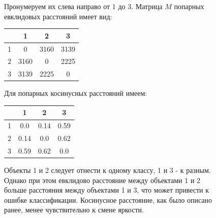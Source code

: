 \documentclass{article}
\begin{document}
\begin{figure}[H]
    Пронумеруем их слева направо от 1 до 3. Матрица $M$ попарных евклидовых расстояний имеет вид:
        \begin{center}
            \begin{tabular}{ c | c  c  c  }
                & 1 & 2 & 3 \\
                \hline
                1 & 0 & 3160 & 3139 \\
                2 & 3160 & 0 & 2225 \\
                3 & 3139 & 2225 & 0 \\
            \end{tabular}
            \end{center}
            Для попарных косинусных расстояний имеем:
            \begin{center}
                \begin{tabular}{ c | c  c  c  }
                    & 1 & 2 & 3 \\
                    \hline
                    1 & 0.0 & 0.14 & 0.59 \\
                    2 & 0.14 & 0.0 & 0.62 \\
                    3 & 0.59 & 0.62 & 0.0 \\
                \end{tabular}
                \end{center}
            Объекты 1 и 2 следует отнести к одному классу, 1 и 3 - к разным.
            Однако при этом евклидово расстояние между объектами 1 и 2 больше расстояния между объектами 1 и 3, что может привести к ошибке классификации.
            Косинусное расстояние, как было описано ранее, менее чувствительно к смене
            яркости.


\end{figure}
\end{document}
